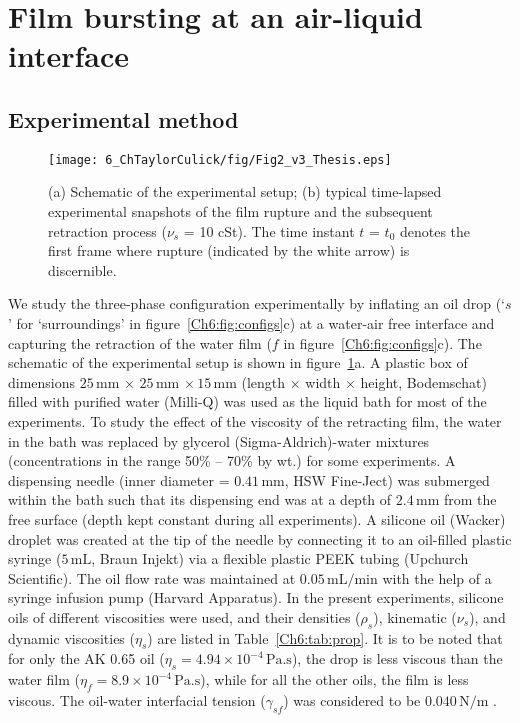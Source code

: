 \section{Film bursting at an air-liquid interface}

\subsection{Experimental method}
\label{Ch6:sec:3-phaseTC Exp methods}
\begin{figure}
	\centering
	\texttt{[image: 6\_ChTaylorCulick/fig/Fig2\_v3\_Thesis.eps]}
	\caption{(a) Schematic of the experimental setup; (b) typical time-lapsed experimental snapshots of the film rupture and the subsequent retraction process ($\nu_{s}$ = 10 cSt). The time instant $t$ = $t_{0}$ denotes the first frame where rupture (indicated by the white arrow) is discernible.}
	\label{Ch6:fig:setup}
\end{figure}

We study the three-phase configuration experimentally by inflating an oil drop (`$s$' for `surroundings' in figure~\ref{Ch6:fig:configs}c) at a water-air free interface and capturing the retraction of the water film ($f$ in figure~\ref{Ch6:fig:configs}c). The schematic of the experimental setup is shown in figure~\ref{Ch6:fig:setup}a. A plastic box of dimensions $25\,\si{\milli\meter}\,\times\,25\,\si{\milli\meter}\,\times15\,\si{\milli\meter}$ (length $\times$ width $\times$ height, Bodemschat) filled with purified water (Milli-Q) was used as the liquid bath for most of the experiments. To study the effect of the viscosity of the retracting film, the water in the bath was replaced by glycerol (Sigma-Aldrich)-water mixtures (concentrations in the range 50\% -- 70\% by wt.) for some experiments. A dispensing needle (inner diameter = $0.41\,\si{\milli\meter}$, HSW Fine-Ject) was submerged within the bath such that its dispensing end was at a depth of $2.4\,\si{\milli\meter}$ from the free surface (depth kept constant during all experiments). A silicone oil (Wacker) droplet was created at the tip of the needle by connecting it to an oil-filled plastic syringe ($5\,\si{\milli\liter}$, Braun Injekt) via a flexible plastic PEEK tubing (Upchurch Scientific). The oil flow rate was maintained at $0.05\,\si{\milli\liter}/\si{\minute}$ with the help of a syringe infusion pump (Harvard Apparatus). In the present experiments, silicone oils of different viscosities were used, and their densities ($\rho_{s}$), kinematic ($\nu_{s}$), and dynamic viscosities ($\eta_{s}$) are listed in Table~\ref{Ch6:tab:prop}. It is to be noted that for only the AK 0.65 oil ($\eta_{s} = 4.94 \times 10^{-4}\,\si{\pascal}.\si{\second}$), the drop is less viscous than the water film ($\eta_{f} = 8.9 \times 10^{-4}\,\si{\pascal}.\si{\second}$), while for all the other oils, the film is less viscous. The oil-water interfacial tension ($\gamma_{sf}$) was considered to be $0.040\,\si{\newton}/\si{\meter}$ \citep{peters-2013-colloidssurfa}. 

